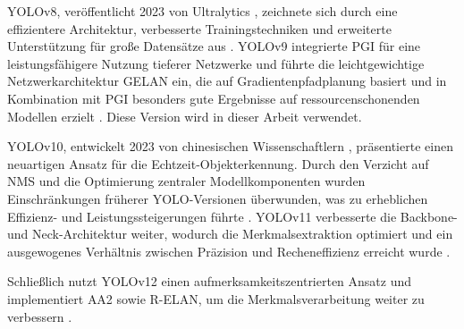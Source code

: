YOLOv8, veröffentlicht 2023 von Ultralytics \cite{ultralyics_2023}, zeichnete sich durch eine effizientere Architektur, verbesserte Trainingstechniken und erweiterte Unterstützung für große Datensätze aus \cite{Sapkota2025,ultralyics_2023}. YOLOv9 \cite{wang2024_sapkota} integrierte \acrfull{PGI} für eine leistungsfähigere Nutzung tieferer Netzwerke und führte die leichtgewichtige Netzwerkarchitektur \acrfull{GELAN} ein, die auf Gradientenpfadplanung basiert und in Kombination mit \acrshort{PGI} besonders gute Ergebnisse auf ressourcenschonenden Modellen erzielt \cite{Sapkota2025,wang2024_sapkota}. Diese Version wird in dieser Arbeit verwendet.

YOLOv10, entwickelt 2023 von chinesischen Wissenschaftlern \cite{wang2024}, präsentierte einen neuartigen Ansatz für die Echtzeit-Objekterkennung. Durch den Verzicht auf \acrfull{NMS} und die Optimierung zentraler Modellkomponenten wurden Einschränkungen früherer YOLO-Versionen überwunden, was zu erheblichen Effizienz- und Leistungssteigerungen führte \cite{wang2024}. YOLOv11 verbesserte die Backbone- und Neck-Architektur weiter, wodurch die Merkmalsextraktion optimiert und ein ausgewogenes Verhältnis zwischen Präzision und Recheneffizienz erreicht wurde \cite{Sapkota2025,ultralyics_yolov11}.

Schließlich nutzt YOLOv12 einen aufmerksamkeitszentrierten Ansatz und implementiert \acrfull{AA2} sowie \acrfull{R-ELAN}, um die Merkmalsverarbeitung weiter zu verbessern \cite{tian2025,Sapkota2025}.

